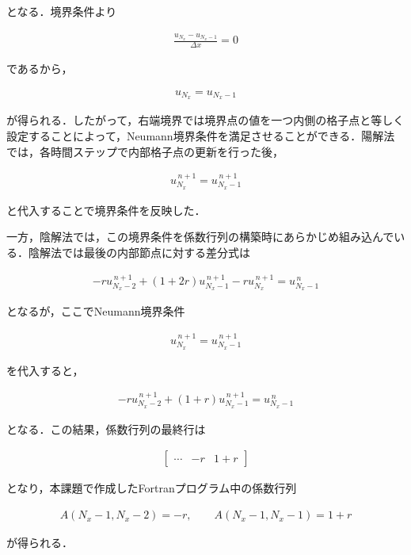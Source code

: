 \documentclass[dvipdfmx]{jsarticle}
\begin{document}
となる．境界条件より

\begin{align}
  \frac{u_{N_x}-u_{N_x-1}}
  {\Delta x}
  =
  0
\end{align}

であるから，

\begin{align}
  u_{N_x}
  =
  u_{N_x-1}
\end{align}

が得られる．したがって，右端境界では境界点の値を一つ内側の格子点と等しく設定することによって，Neumann境界条件を満足させることができる．陽解法では，各時間ステップで内部格子点の更新を行った後，

\begin{align}
  u_{N_x}^{\,n+1}
  =
  u_{N_x-1}^{\,n+1}
\end{align}

と代入することで境界条件を反映した．

一方，陰解法では，この境界条件を係数行列の構築時にあらかじめ組み込んでいる．陰解法では最後の内部節点に対する差分式は

\begin{align}
  -r u_{N_x-2}^{\,n+1}
  +
  (1+2r)u_{N_x-1}^{\,n+1}
  -
  r u_{N_x}^{\,n+1}
  =
  u_{N_x-1}^{\,n}
\end{align}

となるが，ここでNeumann境界条件

\begin{align}
  u_{N_x}^{\,n+1}
  =
  u_{N_x-1}^{\,n+1}
\end{align}

を代入すると，

\begin{align}
  -r u_{N_x-2}^{\,n+1}
  +
  (1+r)u_{N_x-1}^{\,n+1}
  =
  u_{N_x-1}^{\,n}
\end{align}

となる．この結果，係数行列の最終行は

\begin{align}
  \begin{bmatrix}
  \cdots
  &
  -r
  &
  1+r
  \end{bmatrix}
\end{align}

となり，本課題で作成したFortranプログラム中の係数行列

\begin{align}
  A(N_x-1,N_x-2)=-r,\qquad
  A(N_x-1,N_x-1)=1+r
\end{align}

が得られる．\\
\end{document}
